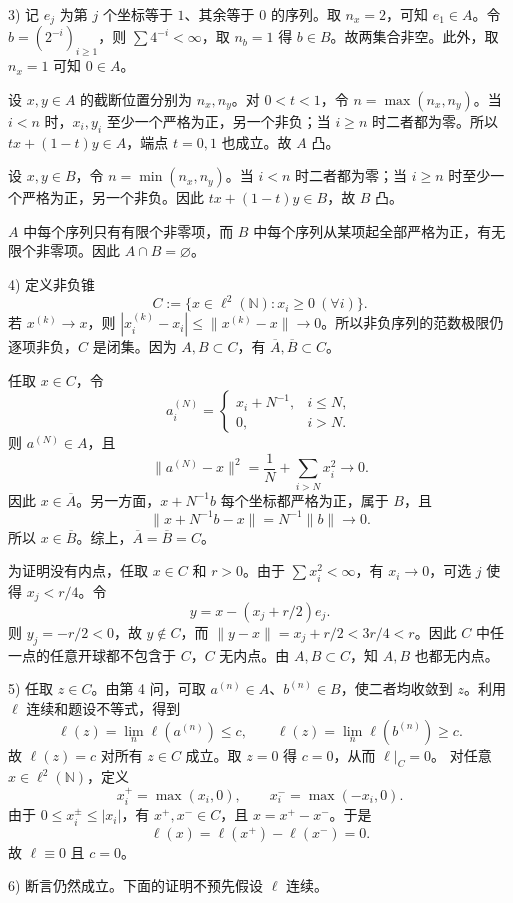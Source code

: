 \documentclass{article}
\begin{document}
3) 记 $e_j$ 为第 $j$ 个坐标等于 $1$、其余等于 $0$ 的序列。取 $n_x=2$，可知 $e_1\in A$。令 $b=(2^{-i})_{i\ge1}$，则 $\sum4^{-i}<\infty$，取 $n_b=1$ 得 $b\in B$。故两集合非空。此外，取 $n_x=1$ 可知 $0\in A$。

设 $x,y\in A$ 的截断位置分别为 $n_x,n_y$。对 $0<t<1$，令 $n=\max(n_x,n_y)$。当 $i<n$ 时，$x_i,y_i$ 至少一个严格为正，另一个非负；当 $i\ge n$ 时二者都为零。所以 $tx+(1-t)y\in A$，端点 $t=0,1$ 也成立。故 $A$ 凸。

设 $x,y\in B$，令 $n=\min(n_x,n_y)$。当 $i<n$ 时二者都为零；当 $i\ge n$ 时至少一个严格为正，另一个非负。因此 $tx+(1-t)y\in B$，故 $B$ 凸。

$A$ 中每个序列只有有限个非零项，而 $B$ 中每个序列从某项起全部严格为正，有无限个非零项。因此 $A\cap B=\varnothing$。

4) 定义非负锥
\[
C:=\{x\in\ell^2(\mathbb N):x_i\ge0\ (\forall i)\}.
\]
若 $x^{(k)}\to x$，则 $|x_i^{(k)}-x_i|\le\|x^{(k)}-x\|\to0$。所以非负序列的范数极限仍逐项非负，$C$ 是闭集。因为 $A,B\subset C$，有 $\overline A,\overline B\subset C$。

任取 $x\in C$，令
\[
a_i^{(N)}=\begin{cases}x_i+N^{-1},&i\le N,\\0,&i>N.\end{cases}
\]
则 $a^{(N)}\in A$，且
\[
\|a^{(N)}-x\|^2=\frac1N+\sum_{i>N}x_i^2\longrightarrow0.
\]
因此 $x\in\overline A$。另一方面，$x+N^{-1}b$ 每个坐标都严格为正，属于 $B$，且
\[
\|x+N^{-1}b-x\|=N^{-1}\|b\|\longrightarrow0.
\]
所以 $x\in\overline B$。综上，$\overline A=\overline B=C$。

为证明没有内点，任取 $x\in C$ 和 $r>0$。由于 $\sum x_i^2<\infty$，有 $x_i\to0$，可选 $j$ 使得 $x_j<r/4$。令
\[
y=x-(x_j+r/2)e_j.
\]
则 $y_j=-r/2<0$，故 $y\notin C$，而 $\|y-x\|=x_j+r/2<3r/4<r$。因此 $C$ 中任一点的任意开球都不包含于 $C$，$C$ 无内点。由 $A,B\subset C$，知 $A,B$ 也都无内点。

5) 任取 $z\in C$。由第 4 问，可取 $a^{(n)}\in A$、$b^{(n)}\in B$，使二者均收敛到 $z$。利用 $\ell$ 连续和题设不等式，得到
\[
\ell(z)=\lim_n\ell(a^{(n)})\le c,
\qquad \ell(z)=\lim_n\ell(b^{(n)})\ge c.
\]
故 $\ell(z)=c$ 对所有 $z\in C$ 成立。取 $z=0$ 得 $c=0$，从而 $\ell|_C=0$。
对任意 $x\in\ell^2(\mathbb N)$，定义
\[
x_i^+=\max(x_i,0),\qquad x_i^-=\max(-x_i,0).
\]
由于 $0\le x_i^\pm\le|x_i|$，有 $x^+,x^-\in C$，且 $x=x^+-x^-$。于是
\[
\ell(x)=\ell(x^+)-\ell(x^-)=0.
\]
故 $\ell\equiv0$ 且 $c=0$。

6) 断言仍然成立。下面的证明不预先假设 $\ell$ 连续。
\end{document}
